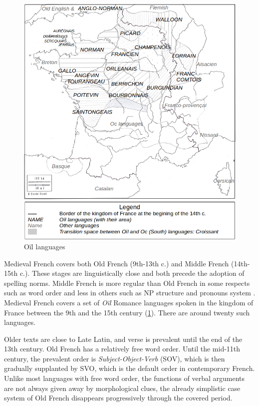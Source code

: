 \begin{figure}[thb]
  \centering
  \includegraphics[scale=0.29]{static/media/mod_eval/bertrade/map-dialects2.png}
  \caption{Oïl languages}
  \label{fig:map-dialects}
\end{figure}

Medieval French covers both Old French (9th-13th c.) and Middle French (14th-15th c.). These stages are linguistically close and both precede the adoption of spelling norms. Middle French is more regular than Old French in some respects such as word order \citep{marchello-Nizia-etal-2020-grande} and less in others such as NP structure and pronouns system \citep{marchello-nizia-etal-1979-histoire}. Medieval French covers a set of \textit{Oïl} Romance languages spoken in the kingdom of France between the 9th and the 15th century (\cref{fig:map-dialects}).
There are around twenty such languages.

Older texts are close to Late Latin, and verse is prevalent until the end of the 13th century. Old French has a relatively free word order.
Until the mid-11th century, the prevalent order is \textit{Subject-Object-Verb} (SOV), which is then gradually supplanted by SVO, which is the default order in contemporary French.
Unlike most languages with free word order, the functions of verbal arguments are not always given away by morphological clues, the already simplistic %
case system of Old French disappears progressively through the covered period.


